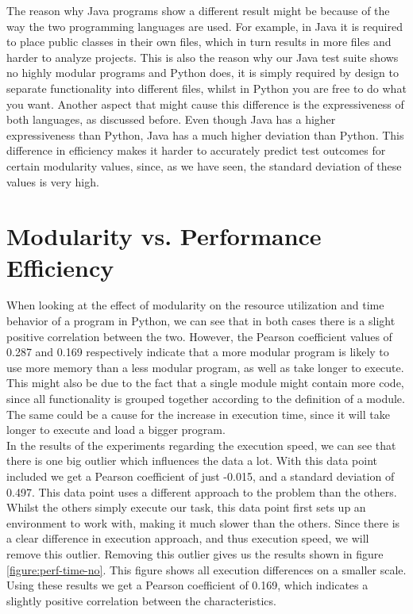 \documentclass[twoside]{uva-inf-bachelor-thesis}
\begin{document}
The reason why Java programs show a different result might be because of the way the two programming languages are used. For example, in Java it is required to place public classes in their own files, which in turn results in more files and harder to analyze projects. This is also the reason why our Java test suite shows no highly modular programs and Python does, it is simply required by design to separate functionality into different files, whilst in Python you are free to do what you want. Another aspect that might cause this  difference is the expressiveness of both languages, as discussed before. Even though Java has a higher expressiveness than Python\cite{Expressiveness}, Java has a much higher deviation than Python. This difference in efficiency makes it harder to accurately predict test outcomes for certain modularity values, since, as we have seen, the standard deviation of these values is very high.

\section{Modularity vs. Performance Efficiency}
When looking at the effect of modularity on the resource utilization and time behavior of a program in Python, we can see that in both cases there is a slight positive correlation between the two. However, the Pearson coefficient values of 0.287 and 0.169 respectively indicate that a more modular program is likely to use more memory than a less modular program, as well as take longer to execute. This might also be due to the fact that a single module might contain more code, since all functionality is grouped together according to the definition of a module. The same could be a cause for the increase in execution time, since it will take longer to execute and load a bigger program.\\

In the results of the experiments regarding the execution speed, we can see that there is one big outlier which influences the data a lot. With this data point included we get a Pearson coefficient of just -0.015, and a standard deviation of 0.497. This data point uses a different approach to the problem than the others. Whilst the others simply execute our task, this data point first sets up an environment to work with, making it much slower than the others. Since there is a clear difference in execution approach, and thus execution speed, we will remove this outlier. Removing this outlier gives us the results shown in figure \ref{figure:perf-time-no}. This figure shows all execution differences on a smaller scale. Using these results we get a Pearson coefficient of 0.169, which indicates a slightly positive correlation between the characteristics.\\
\end{document}
